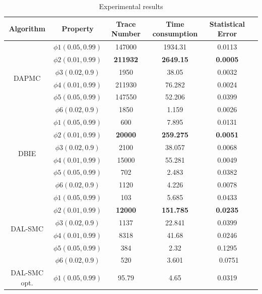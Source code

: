 \begin{table}
\caption{Experimental results}
\centering
\begin{tabular}{c c c c c c} 
        \hline  
        Algorithm & Property & Trace Number & Time consumption & Statistical Error\\
        \hline
        \multirow{6}{1.5cm}{DAPMC}  
                & $\phi1(0.05,0.99)$ &  147000&  1934.31&  0.0113\\ 
                & $\phi2(0.01,0.99)$ &  \textbf{211932} &  \textbf{2649.15} &  \textbf{0.0005}\\ 
                & $\phi3(0.02,0.9)$ &  1950&     38.05& 0.0032\\ 
                & $\phi4(0.01,0.99)$ &  211930&  76.282 &  0.0024\\ 
                & $\phi5(0.05,0.99)$ &  147550&  52.206&  0.0399\\ 
                & $\phi6(0.02,0.9)$ &  1850&     1.159& 0.0026\\     
        \hline 
        \multirow{6}{1.5cm}{DBIE}  
                & $\phi1(0.05,0.99)$ &  600&  7.895&  0.0131\\ 
                & $\phi2(0.01,0.99)$ &  \textbf{20000}&  \textbf{259.275} &  \textbf{0.0051} \\ 
                & $\phi3(0.02,0.9)$ &  2100& 38.057& 0.0068\\ 
                & $\phi4(0.01,0.99)$ & 15000&  55.281 &  0.0049\\ 
                & $\phi5(0.05,0.99)$ &  702&  2.483&  0.0382\\ 
                & $\phi6(0.02,0.9)$ &  1120& 4.226& 0.0078\\      
        \hline 
        \multirow{6}{1.5cm}{DAL-SMC}  
                & $\phi1(0.05,0.99)$ &  103&  5.685&  0.0433\\ 
                & $\phi2(0.01,0.99)$ &  \textbf{12000}&  \textbf{151.785} &  \textbf{0.0235} \\ 
                & $\phi3(0.02,0.9)$ &  1137& 22.841& 0.0399\\ 
                & $\phi4(0.01,0.99)$ &  8318&  41.68 &  0.0246\\ 
                & $\phi5(0.05,0.99)$ &  384&  2.32&  0.1295\\ 
                & $\phi6(0.02,0.9)$ &  520& 3.601& \ 0.0751\\      
        \hline 
         \multirow{6}{1.5cm}{DAL-SMC opt.}  
                & $\phi1(0.05,0.99)$ &  95.79&  4.65&  0.0319\\ 

\end{tabular}
\end{table}
